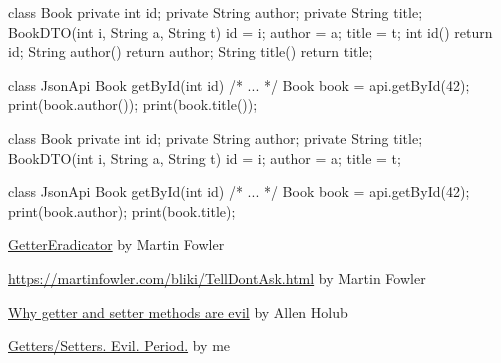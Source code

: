 \documentclass{article}
\begin{document}
\begin{pptWide}{2}
{\small\begin{ffcode}
class Book {
  private int id;
  private String author;
  private String title;
  BookDTO(int i, String a, String t)
    { id = i; author = a; title = t; }
  int id() { return id; }
  String author() { return author; }
  String title() { return title; }
}
\end{ffcode}
}
\par\columnbreak\par
{\small\begin{ffcode}
class JsonApi {
  Book getById(int id) { /* ... */ }
}
Book book = api.getById(42);
print(book.author());
print(book.title());
\end{ffcode}
}
\end{pptWide}
\par
\plush{}

\begin{pptWide}{2}
{\small\begin{ffcode}
class Book {
  private int id;
  private String author;
  private String title;
  BookDTO(int i, String a, String t)
    { id = i; author = a; title = t; }
}
\end{ffcode}
}
\par\columnbreak\par
{\small\begin{ffcode}
class JsonApi {
  Book getById(int id) { /* ... */ }
}
Book book = api.getById(42);
print(book.author);
print(book.title);
\end{ffcode}
}
\end{pptWide}
\par
\plush{}


\href{https://martinfowler.com/bliki/GetterEradicator.html}{GetterEradicator} by Martin Fowler

\href{TellDontAsk}{https://martinfowler.com/bliki/TellDontAsk.html} by Martin Fowler

\href{https://www.infoworld.com/article/2073723/why-getter-and-setter-methods-are-evil.html}{Why getter and setter methods are evil} by Allen Holub

\href{https://www.yegor256.com/2014/09/16/getters-and-setters-are-evil.html}{Getters/Setters. Evil. Period.} by me
\end{document}
